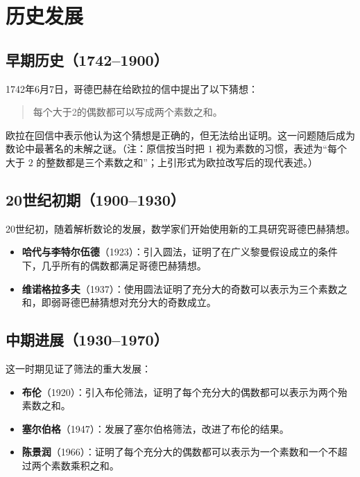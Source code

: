 \section{历史发展}\label{sec:history}

\subsection{早期历史（1742--1900）}

1742年6月7日，哥德巴赫在给欧拉的信中提出了以下猜想：

\begin{quote}
    每个大于2的偶数都可以写成两个素数之和。
\end{quote}

欧拉在回信中表示他认为这个猜想是正确的，但无法给出证明。这一问题随后成为数论中最著名的未解之谜。（注：原信按当时把 $1$ 视为素数的习惯，表述为“每个大于 $2$ 的整数都是三个素数之和”；上引形式为欧拉改写后的现代表述。）

\subsection{20世纪初期（1900--1930）}

20世纪初，随着解析数论的发展，数学家们开始使用新的工具研究哥德巴赫猜想。

\begin{itemize}
    \item \textbf{哈代与李特尔伍德}（1923）：引入圆法，证明了在广义黎曼假设成立的条件下，几乎所有的偶数都满足哥德巴赫猜想\cite{hardy1923some}。
    \item \textbf{维诺格拉多夫}（1937）：使用圆法证明了充分大的奇数可以表示为三个素数之和，即弱哥德巴赫猜想对充分大的奇数成立\cite{vinogradov1937representation}。
\end{itemize}

\subsection{中期进展（1930--1970）}

这一时期见证了筛法的重大发展：

\begin{itemize}
    \item \textbf{布伦}（1920）：引入布伦筛法，证明了每个充分大的偶数都可以表示为两个殆素数之和\cite{brun1920sieve}。
    \item \textbf{塞尔伯格}（1947）：发展了塞尔伯格筛法，改进了布伦的结果\cite{selberg1949sieve}。
    \item \textbf{陈景润}（1966）：证明了每个充分大的偶数都可以表示为一个素数和一个不超过两个素数乘积之和\cite{chen1966representation}。
\end{itemize}

